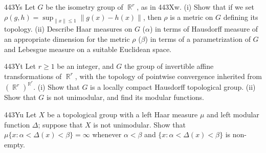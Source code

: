 {\spheader 443Ys Let $G$ be the isometry group of $\BbbR^r$, as in
443Xw.   (i) Show that
if we set $\rho(g,h)=\sup_{\|x\|\le 1}\|g(x)-h(x)\|$, then $\rho$ is a
metric on $G$ defining its topology.   (ii) Describe Haar measures
on $G$ ($\alpha$) in terms of Hausdorff measure of an appropriate
dimension for the metric $\rho$
($\beta$) in terms of a parametrization of $G$ and
Lebesgue measure on a suitable Euclidean space.

\spheader 443Yt Let $r\ge 1$ be an integer, and $G$ the group of
invertible affine transformations of $\BbbR^r$, with the topology of
pointwise convergence inherited from $(\BbbR^r)^{\BbbR^r}$.   (i) Show
that $G$ is a locally compact Hausdorff topological group.
(ii) Show that $G$ is
not unimodular, and find its modular functions.

\spheader 443Yu Let $X$ be a topological group with a left Haar measure
$\mu$ and left modular function $\Delta$;  suppose that $X$ is not
unimodular.   Show that
$\mu\{x:\alpha<\Delta(x)<\beta\}=\infty$ whenever $\alpha<\beta$
and $\{x:\alpha<\Delta(x)<\beta\}$ is non-empty.
}%


